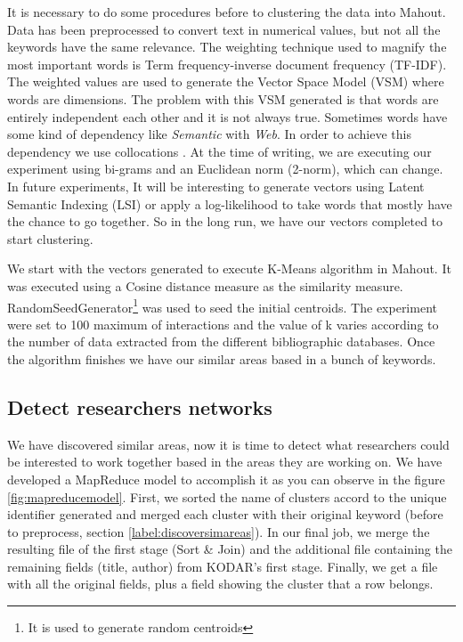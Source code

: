 \documentclass[11pt]{article}
\begin{document}
It is necessary to do some procedures before to clustering the data into Mahout. Data has been preprocessed to convert text in numerical values, but not all the keywords have the same relevance. The weighting technique used to magnify the most important words is Term frequency-inverse document frequency (TF-IDF). The weighted values are used to generate the Vector Space Model (VSM) where words are dimensions. The problem with this VSM generated is that words are entirely independent each other and it is not always true. Sometimes words have some kind of dependency like \emph{Semantic} with \emph{Web}. In order to achieve this dependency we use collocations \cite{Manning}. At the time of writing, we are executing our experiment using bi-grams and an Euclidean norm (2-norm), which can change. In future experiments, It will be interesting to generate vectors using Latent Semantic Indexing (LSI) or apply a log-likelihood to take words that mostly have the chance to go together. So in the long run, we have our vectors completed to start clustering.

We start with the vectors generated to execute K-Means algorithm in Mahout. It was executed using a Cosine distance measure as the similarity measure. RandomSeedGenerator\footnote{It is used to generate random centroids} was used to seed the initial centroids. The experiment were set to 100 maximum of interactions and the value of k varies according to the number of data extracted from the different bibliographic databases. Once the algorithm finishes we have our similar areas based in a bunch of keywords.


\subsection{Detect researchers networks}

We have discovered similar areas, now it is time to detect what researchers could be interested to work together based in the areas they are working on. We have developed a MapReduce model to accomplish it as you can observe in the figure \ref{fig:mapreducemodel}. First, we sorted the name of clusters accord to the unique identifier generated and merged each cluster with their original keyword (before to preprocess, section \ref{label:discoversimareas}). In our final job, we merge the resulting file of the first stage (Sort \& Join) and the additional file containing the remaining fields (title, author) from KODAR's first stage. Finally, we get a file with all the original fields, plus a field showing the cluster that a row belongs.
\end{document}
